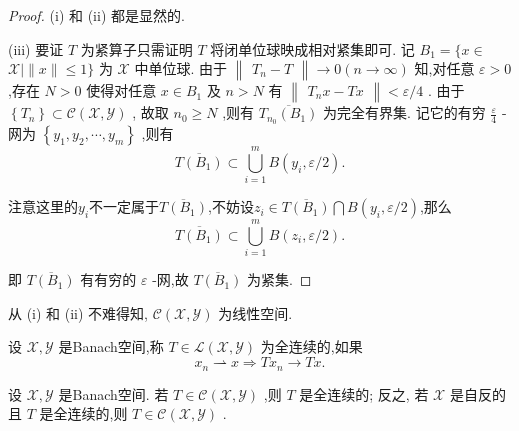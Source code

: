 \documentclass[lang=cn,newtx,10pt,scheme=chinese,thmcnt=chapter]{elegantbook}
\begin{document}
\begin{proof}
    (i) 和 (ii) 都是显然的.

(iii) 要证 \(T\) 为紧算子只需证明 \(T\) 将闭单位球映成相对紧集即可. 记 \({B}_{1} = \{ x \in\)  \(\mathcal{X} \mid  \parallel x\parallel  \leqslant  1\}\) 为 \(\mathcal{X}\) 中单位球. 由于 \(\begin{Vmatrix}{{T}_{n} - T}\end{Vmatrix} \rightarrow  0\left( {n \rightarrow  \infty }\right)\) 知,对任意 \(\varepsilon  > 0\) ,存在 \(N > 0\) 使得对任意 \(x \in  {B}_{1}\) 及 \(n > N\) 有 \(\begin{Vmatrix}{{T}_{n}x - {Tx}}\end{Vmatrix} < \varepsilon /4\) . 由于 \(\left\{  {T}_{n}\right\}   \subset  \mathcal{C}\left( {\mathcal{X},\mathcal{Y}}\right)\) , 故取 \({n}_{0} \geq  N\) ,则有 \(\overline{{T}_{{n}_{0}}\left( {B}_{1}\right) }\) 为完全有界集. 记它的有穷 \(\frac{\varepsilon }{4}\) - 网为 \(\left\{  {{y}_{1},{y}_{2},\cdots ,{y}_{m}}\right\}\) ,则有
\begin{equation*}
\overline{T\left( {B}_{1}\right) } \subset  \mathop{\bigcup }\limits_{{i = 1}}^{m}B\left( {{y}_{i},\varepsilon/2 }\right) .
\end{equation*}

注意这里的$y_i$不一定属于$\overline{T\left( {B}_{1}\right) } $,不妨设$z_i \in \overline{T\left( {B}_{1}\right) } \bigcap B\left( {{y}_{i},\varepsilon/2 }\right)  $,那么\begin{equation*}
\overline{T\left( {B}_{1}\right) } \subset  \mathop{\bigcup }\limits_{{i = 1}}^{m}B\left( {{z}_{i},\varepsilon/2 }\right) .
\end{equation*}

即 \(\overline{T\left( {B}_{1}\right) }\) 有有穷的 \(\varepsilon\) -网,故 \(\overline{T\left( {B}_{1}\right) }\) 为紧集.
\end{proof}
\begin{note}
    从 (i) 和 (ii) 不难得知, \(\mathcal{C}\left( {\mathcal{X},\mathcal{Y}}\right)\) 为线性空间.
\end{note}
\begin{definition}
    设 \(\mathcal{X},\mathcal{Y}\) 是Banach空间,称 \(T \in  \mathcal{L}\left( {\mathcal{X},\mathcal{Y}}\right)\) 为全连续的,如果
\begin{equation*}
{x}_{n} \rightharpoonup  x \Rightarrow  T{x}_{n} \rightarrow  {Tx}.
\end{equation*}

\end{definition}
\begin{theorem}
    设 \(\mathcal{X},\mathcal{Y}\) 是Banach空间. 若 \(T \in  \mathcal{C}\left( {\mathcal{X},\mathcal{Y}}\right)\) ,则 \(T\) 是全连续的; 反之, 若 \(\mathcal{X}\) 是自反的且 \(T\) 是全连续的,则 \(T \in  \mathcal{C}\left( {\mathcal{X},\mathcal{Y}}\right)\) .

\end{theorem}
\end{document}

